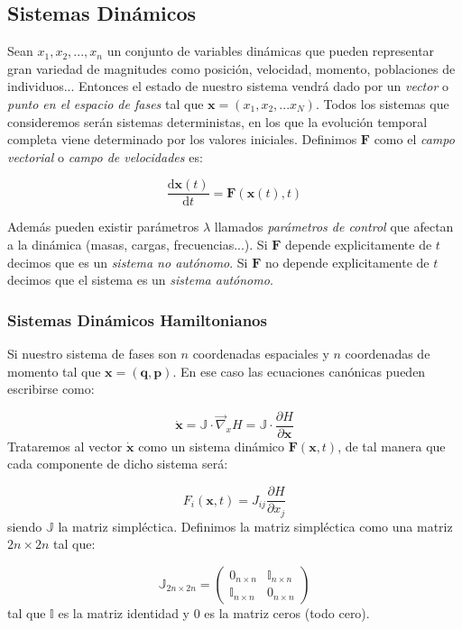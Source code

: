 \documentclass[12pt,a4paper]{article}
\numberwithin{equation}{section}
\numberwithin{figure}{section}
\newcommand{\parciales}[2]{\frac{\partial #1}{\partial #2}}
\newcommand{\D}{\mathrm{d}}
\newcommand{\derivadas}[2]{\frac{\D #1}{\D #2}}
\newcommand{\xn}{\mathbf{x}}
\newcommand{\pn}{\mathbf{p}}
\newcommand{\qn}{\mathbf{q}}
\newcommand{\Fn}{\mathbf{F}}
\begin{document}
\subsection{Sistemas Dinámicos}

Sean $x_1,x_2,...,x_n$ un conjunto de variables dinámicas que pueden representar gran variedad de magnitudes como posición, velocidad, momento, poblaciones de individuos... Entonces el estado de nuestro sistema vendrá dado por un \textit{vector} o \textit{punto en el espacio de fases} tal que $\xn = (x_1,x_2,...x_N)$. Todos los sistemas que consideremos serán sistemas deterministas, en los que la evolución temporal completa viene determinado por los valores iniciales. Definimos $\Fn$ como el \textit{campo vectorial} o \textit{campo de velocidades} es:

\begin{equation}
\derivadas{\xn(t)}{t} = \Fn (\xn(t),t)
\end{equation}

Además pueden existir parámetros $\lambda$ llamados \textit{parámetros de control} que afectan a la dinámica (masas, cargas, frecuencias...). Si $\Fn$ depende explicitamente de $t$ decimos que es un \textit{sistema no autónomo}. Si $\Fn$ no depende explicitamente de $t$ decimos que el sistema es un \textit{sistema autónomo}. \\

\subsubsection{Sistemas Dinámicos Hamiltonianos}

Si nuestro sistema de fases son $n$ coordenadas espaciales y $n$ coordenadas de momento tal que $\xn = (\qn,\pn)$. En ese caso las ecuaciones canónicas pueden escribirse como:

\begin{equation}
\dot{\xn} = \mathbb{J} \cdot \vec{\nabla}_x H = \mathbb{J} \cdot \parciales{H}{\xn}
\end{equation}
Trataremos al vector $\dot{\xn}$ como un sistema dinámico $\Fn(\xn,t)$, de tal manera que cada componente de dicho sistema será:

\begin{equation}
F_i (\xn,t) = J_{ij} \parciales{H}{x_j}
\end{equation}
siendo $\mathbb{J}$ la matriz simpléctica. Definimos la matriz simpléctica como una matriz $2n \times 2n $ tal que:

\begin{equation}
\mathbb{J}_{2n \times 2n} = \begin{pmatrix}
0_{n \times n} & \mathbb{I}_{n \times n} \\
\mathbb{I}_{n \times n} & 0_{n \times n}
\end{pmatrix}
\end{equation}
tal que $\mathbb{I}$ es la matriz identidad y $0$ es la matriz ceros (todo cero).
\end{document}
